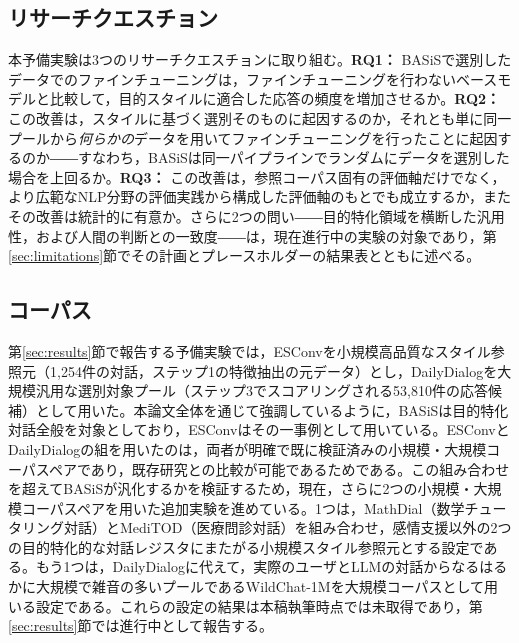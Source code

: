\documentclass[manuscript,review,anonymous]{acmart}
\begin{document}
\subsection{リサーチクエスチョン}
本予備実験は3つのリサーチクエスチョンに取り組む。\textbf{RQ1：} BASiSで選別したデータでのファインチューニングは，ファインチューニングを行わないベースモデルと比較して，目的スタイルに適合した応答の頻度を増加させるか。\textbf{RQ2：} この改善は，スタイルに基づく選別そのものに起因するのか，それとも単に同一プールから\emph{何らかの}データを用いてファインチューニングを行ったことに起因するのか――すなわち，BASiSは同一パイプラインでランダムにデータを選別した場合を上回るか。\textbf{RQ3：} この改善は，参照コーパス固有の評価軸だけでなく，より広範なNLP分野の評価実践から構成した評価軸のもとでも成立するか，またその改善は統計的に有意か。さらに2つの問い――目的特化領域を横断した汎用性，および人間の判断との一致度――は，現在進行中の実験の対象であり，第\ref{sec:limitations}節でその計画とプレースホルダーの結果表とともに述べる。

\subsection{コーパス}
\label{sec:corpora}
第\ref{sec:results}節で報告する予備実験では，ESConv\cite{liu2021esconv}を小規模高品質なスタイル参照元（1{,}254件の対話，ステップ1の特徴抽出の元データ）とし，DailyDialog\cite{li2017dailydialog}を大規模汎用な選別対象プール（ステップ3でスコアリングされる53{,}810件の応答候補）として用いた。本論文全体を通じて強調しているように，BASiSは目的特化対話全般を対象としており，ESConvはその一事例として用いている。ESConvとDailyDialogの組を用いたのは，両者が明確で既に検証済みの小規模・大規模コーパスペアであり，既存研究との比較が可能であるためである\cite{wen2025guidedtod,wan2025emodynamix}。この組み合わせを超えてBASiSが汎化するかを検証するため，現在，さらに2つの小規模・大規模コーパスペアを用いた追加実験を進めている。1つは，MathDial\cite{macina2023mathdial}（数学チュータリング対話）とMediTOD\cite{saley2024meditod}（医療問診対話）を組み合わせ，感情支援以外の2つの目的特化的な対話レジスタにまたがる小規模スタイル参照元とする設定である。もう1つは，DailyDialogに代えて，実際のユーザとLLMの対話からなるはるかに大規模で雑音の多いプールであるWildChat-1M\cite{zhao2024wildchat}を大規模コーパスとして用いる設定である。これらの設定の結果は本稿執筆時点では未取得であり，第\ref{sec:results}節では進行中として報告する。
\end{document}
